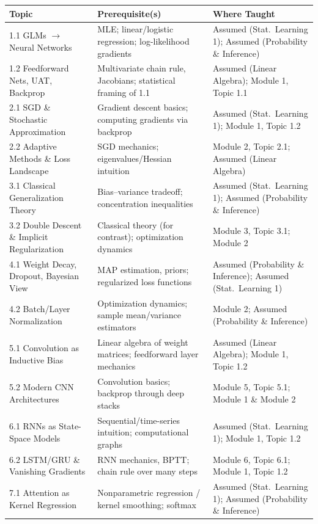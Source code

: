 \documentclass[11pt]{article}
\begin{document}
\begin{longtable}{@{}p{4.6cm}p{5.4cm}p{5.2cm}@{}}
\toprule
\textbf{Topic} & \textbf{Prerequisite(s)} & \textbf{Where Taught} \\
\midrule
\endhead
1.1 GLMs $\to$ Neural Networks & MLE; linear/logistic regression; log-likelihood gradients & Assumed (Stat.\ Learning 1); Assumed (Probability \& Inference) \\
1.2 Feedforward Nets, UAT, Backprop & Multivariate chain rule, Jacobians; statistical framing of 1.1 & Assumed (Linear Algebra); Module 1, Topic 1.1 \\
2.1 SGD \& Stochastic Approximation & Gradient descent basics; computing gradients via backprop & Assumed (Stat.\ Learning 1); Module 1, Topic 1.2 \\
2.2 Adaptive Methods \& Loss Landscape & SGD mechanics; eigenvalues/Hessian intuition & Module 2, Topic 2.1; Assumed (Linear Algebra) \\
3.1 Classical Generalization Theory & Bias--variance tradeoff; concentration inequalities & Assumed (Stat.\ Learning 1); Assumed (Probability \& Inference) \\
3.2 Double Descent \& Implicit Regularization & Classical theory (for contrast); optimization dynamics & Module 3, Topic 3.1; Module 2 \\
4.1 Weight Decay, Dropout, Bayesian View & MAP estimation, priors; regularized loss functions & Assumed (Probability \& Inference); Assumed (Stat.\ Learning 1) \\
4.2 Batch/Layer Normalization & Optimization dynamics; sample mean/variance estimators & Module 2; Assumed (Probability \& Inference) \\
5.1 Convolution as Inductive Bias & Linear algebra of weight matrices; feedforward layer mechanics & Assumed (Linear Algebra); Module 1, Topic 1.2 \\
5.2 Modern CNN Architectures & Convolution basics; backprop through deep stacks & Module 5, Topic 5.1; Module 1 \& Module 2 \\
6.1 RNNs as State-Space Models & Sequential/time-series intuition; computational graphs & Assumed (Stat.\ Learning 1); Module 1, Topic 1.2 \\
6.2 LSTM/GRU \& Vanishing Gradients & RNN mechanics, BPTT; chain rule over many steps & Module 6, Topic 6.1; Module 1, Topic 1.2 \\
7.1 Attention as Kernel Regression & Nonparametric regression / kernel smoothing; softmax & Assumed (Stat.\ Learning 1); Assumed (Probability \& Inference) \\

\end{longtable}
\end{document}
